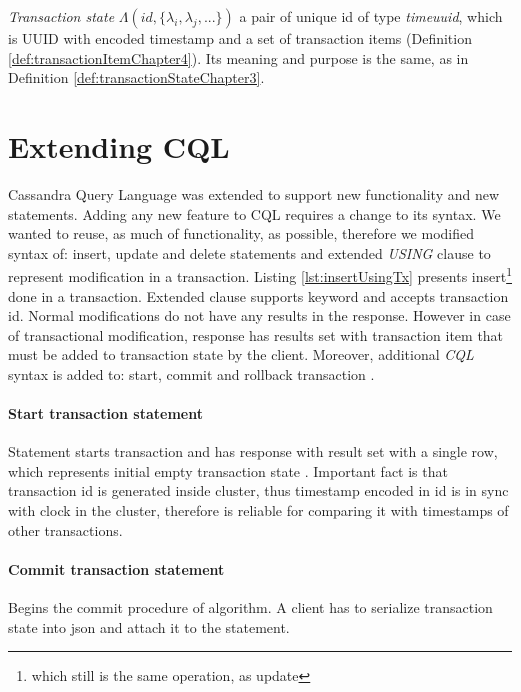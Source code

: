\begin{definition}
\label{def:transactionStateChapter4}
\emph{Transaction state} $\Lambda(\mathit{id}, \{\lambda_{i}, \lambda_{j}, ...\})$ a pair of unique id of type \emph{timeuuid}, which is UUID with encoded timestamp \cite{CassandraUUID} and a set of transaction items (Definition \ref{def:transactionItemChapter4}). Its meaning and purpose is the same, as in Definition \ref{def:transactionStateChapter3}.
\end{definition}


\section{Extending CQL}
Cassandra Query Language was extended to support new functionality and new statements. Adding any new feature to CQL requires a change to its syntax. We wanted to reuse, as much of functionality, as possible, therefore we modified syntax of: insert, update and delete statements and extended \emph{USING} clause to represent modification in a transaction. Listing \ref{lst:insertUsingTx} presents insert\footnote{which still is the same operation, as update} done in a transaction. Extended  clause supports  keyword and accepts transaction id. Normal modifications do not have any results in the response. However in case of transactional modification, response has results set with transaction item that must be added to transaction state by the client. Moreover, additional \emph{CQL} syntax is added to: start, commit and rollback transaction \transaction.

\paragraph{Start transaction statement} 
Statement starts transaction and has response with result set with a single row, which represents initial empty transaction state . 
 Important fact is that transaction id is generated inside cluster, thus timestamp encoded in id is in sync with clock in the cluster, therefore is reliable for comparing it with timestamps of other transactions.

\paragraph{Commit transaction statement} 
Begins the commit procedure of \mpt algorithm. A client has to serialize transaction state \txState into json and attach it to the statement.



